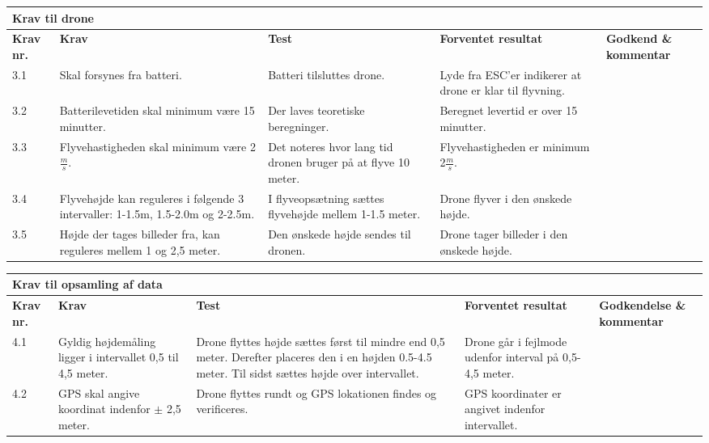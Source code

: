     \centering
    \begin{tabular}{|p{}|p{3.2 cm}|p{3.2 cm}|p{3.2 cm}|p{2.2 cm}|}
			\hline
			\multicolumn{5}{|l|}{\textbf{{\large Krav til drone}}}\\ \hline
			\textbf{Krav nr.} & \textbf{Krav} & \textbf{Test} & \textbf{Forventet \newline resultat} & 			
			\textbf{Godkend \& \newline kommentar} \\ \hline
			
			3.1 & Skal forsynes fra batteri.
				& Batteri tilsluttes drone.
				& Lyde fra ESC'er indikerer at drone er klar til flyvning.
				& \\ \hline

			3.2 & Batterilevetiden skal minimum være 15 minutter.
				& Der laves teoretiske beregninger.
				& Beregnet levertid er over 15 minutter.
				&  \\ \hline
			
			3.3 & Flyvehastigheden skal minimum være 2$\frac{m}{s}$.
				& Det noteres hvor lang tid dronen bruger på at flyve 10 meter.
				& Flyvehastigheden er minimum 2$\frac{m}{s}$.
				& \\ \hline		
				
			3.4 & Flyvehøjde kan reguleres i følgende 3 intervaller: 1-1.5m, 1.5-2.0m og 2-2.5m.
				& I flyveopsætning sættes flyvehøjde mellem 1-1.5 meter.
				& Drone flyver i den ønskede højde.
				& \\ \hline	
				
			3.5 & Højde der tages billeder fra, kan reguleres mellem 1 og 2,5 meter.
				& Den ønskede højde sendes til dronen.
				& Drone tager billeder i den ønskede højde.
				& \\ \hline	
		\end{tabular}
	\label{tab:krav_1}

\vspace{2cm}

    \centering
    \begin{tabular}{|p{}|p{3.2 cm}|p{3.2 cm}|p{3.2 cm}|p{2.2 cm}|}
			\hline
			\multicolumn{5}{|l|}{\textbf{{\large Krav til opsamling af data}}}\\ \hline
			\textbf{Krav nr.} & \textbf{Krav} & \textbf{Test} & \textbf{Forventet \newline resultat} & 			
			\textbf{Godkendelse \& \newline kommentar} \\ \hline
			
			4.1 & Gyldig højdemåling ligger i intervallet 0,5 til 4,5 meter.
				& Drone flyttes højde sættes først til mindre end 0,5 meter. Derefter placeres den i en højden 0.5-4.5 meter. Til sidst sættes højde over intervallet. 
				& Drone går i fejlmode udenfor interval på 0,5-4,5 meter.
				& \\ \hline

			4.2 & GPS skal angive koordinat indenfor $\pm$ 2,5 meter. 
				& Drone flyttes rundt og GPS lokationen findes og verificeres.
				& GPS koordinater er angivet indenfor intervallet. 
				&  \\ \hline		
		\end{tabular}
	\label{tab:krav_1}
